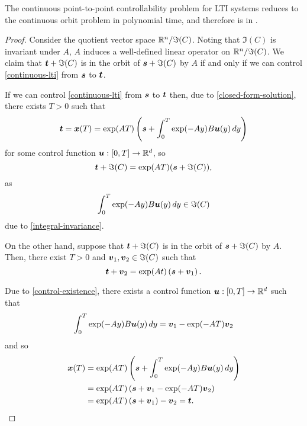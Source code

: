 \begin{theorem}
The continuous point-to-point controllability problem for LTI systems reduces to the continuous orbit problem in polynomial time, and therefore is in \PTIME{}.
\end{theorem}

\begin{proof}
Consider the quotient vector space $\mathbb{R}^{n} / \Im(C)$. Noting that $\Im(C)$ is invariant under $A$, $A$ induces a well-defined linear operator on $\mathbb{R}^{n} / \Im(C)$. We claim that $\boldsymbol{t} + \Im(C)$ is in the orbit of $\boldsymbol{s} + \Im(C)$ by $A$ if and only if we can control \cref{continuous-lti} from $\boldsymbol{s}$ to $\boldsymbol{t}$.

If we can control \cref{continuous-lti} from $\boldsymbol{s}$ to $\boldsymbol{t}$ then, due to \cref{closed-form-solution}, there exists $T>0$ such that
\begin{equation*}
\boldsymbol{t} = \boldsymbol{x}(T) = \exp(A T) \left( \boldsymbol{s} + \int_{0}^{T} \exp(-Ay) B \boldsymbol{u}(y) \, dy \right)
\end{equation*}
for some control function $\boldsymbol{u} : [0,T] \rightarrow \mathbb{R}^{d}$, so
\begin{equation*}
\boldsymbol{t} + \Im(C) = \exp(A T) (\boldsymbol{s} + \Im(C)),
\end{equation*}
as
\begin{equation*}
\int_{0}^{T} \exp(-Ay) B \boldsymbol{u}(y) \, dy \in \Im(C)
\end{equation*}
due to \cref{integral-invariance}.

On the other hand, suppose that $\boldsymbol{t} + \Im(C)$ is in the orbit of $\boldsymbol{s} + \Im(C)$ by $A$. Then, there exist $T>0$ and $\boldsymbol{v}_{1}, \boldsymbol{v}_{2} \in \Im(C)$ such that
\begin{equation*}
\boldsymbol{t} + \boldsymbol{v}_{2} = \exp(At) \left( \boldsymbol{s} + \boldsymbol{v}_{1} \right).
\end{equation*}

Due to \cref{control-existence}, there exists a control function $\boldsymbol{u} : [0,T] \rightarrow \mathbb{R}^{d}$ such that
\begin{equation*}
\int_{0}^{T} \exp(-Ay) B \boldsymbol{u}(y) \, dy = \boldsymbol{v}_{1} - \exp(-A T) \boldsymbol{v}_{2}
\end{equation*}
and so
\begin{align*}
\boldsymbol{x}(T) &= \exp(A T) \left( \boldsymbol{s} + \int_{0}^{T} \exp(-Ay) B \boldsymbol{u}(y) \, dy \right) \\
&= \exp(A T) \left( \boldsymbol{s} + \boldsymbol{v}_{1} - \exp(-A T) \boldsymbol{v}_{2} \right) \\
&= \exp(A T) \left( \boldsymbol{s} + \boldsymbol{v}_{1} \right) - \boldsymbol{v}_{2} = \boldsymbol{t} .
\end{align*}

\end{proof}
